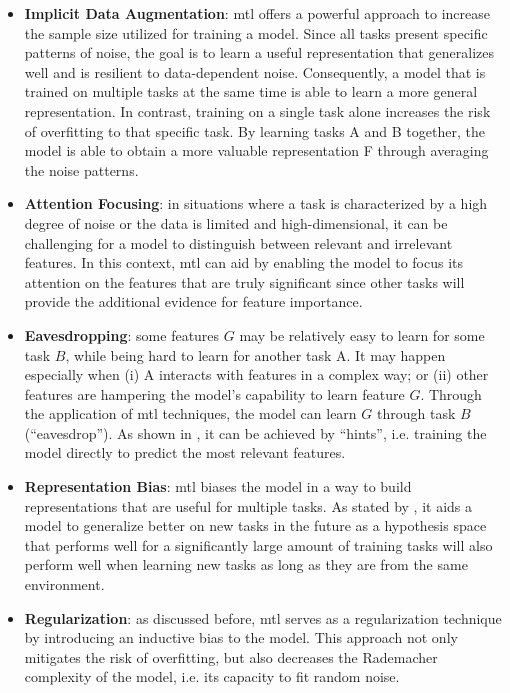 \begin{itemize}
\item \textbf{Implicit Data Augmentation}: \acl{mtl} offers a powerful approach to increase the sample size utilized for training a model. Since all tasks present specific patterns of noise, the goal is to learn a useful representation that generalizes well and is resilient to data-dependent noise. Consequently, a model that is trained on multiple tasks at the same time is able to learn a more general representation. In contrast, training on a single task alone increases the risk of overfitting to that specific task. By learning tasks A and B together, the model is able to obtain a more valuable representation F through averaging the noise patterns.

\item \textbf{Attention Focusing}: in situations where a task is characterized by a high degree of noise or the data is limited and high-dimensional, it can be challenging for a model to distinguish between relevant and irrelevant features. In this context, \acs{mtl} can aid by enabling the model to focus its attention on the features that are truly significant since other tasks will provide the additional evidence for feature importance.

\item \textbf{Eavesdropping}: some features $G$ may be relatively easy to learn for some task $B$, while being hard to learn for another task A. It may happen especially when (i) A interacts with features in a complex way; or (ii) other features are hampering the model's capability to learn feature $G$. Through the application of \acs{mtl} techniques, the model can learn $G$ through task $B$ (``eavesdrop''). As shown in \citep{abu1990learning}, it can be achieved by ``hints'', i.e. training the model directly to predict the most relevant features.

\item \textbf{Representation Bias}: \acs{mtl} biases the model in a way to build representations that are useful for multiple tasks. As stated by \cite{baxter2000model}, it aids a model to generalize better on new tasks in the future as a hypothesis space that performs well for a significantly large amount of training tasks will also perform well when learning new tasks as long as they are from the same environment.

\item \textbf{Regularization}: as discussed before, \acl{mtl} serves as a regularization technique by introducing an inductive bias to the model. This approach not only mitigates the risk of overfitting, but also decreases the Rademacher complexity of the model, i.e. its capacity to fit random noise.
\end{itemize}

